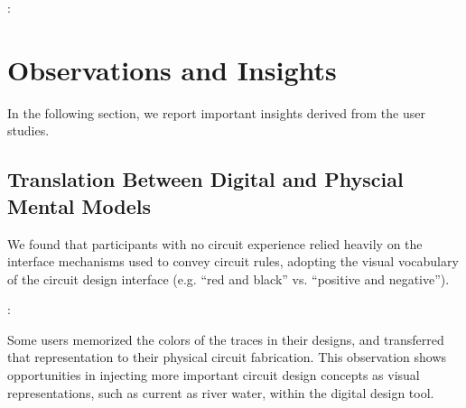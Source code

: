 \documentclass{sigchi}
\begin{document}
  \begin{myquote}
   \vspace{-2pt}
    :
    \vspace{-2pt}
  \end{myquote}

\section{Observations and Insights}
In the following section, we report important insights derived from the user studies.

  \subsection{Translation Between Digital and Physcial Mental Models}
  We found that participants with no circuit experience relied heavily on the interface mechanisms used to convey circuit rules, adopting the visual vocabulary of the circuit design interface (e.g. ``red and black'' vs. ``positive and negative'').
  \begin{myquote}
   \vspace{-2pt}
    :
    \vspace{-2pt}
  \end{myquote}
 Some users memorized the colors of the traces in their designs, and transferred that representation to their physical circuit fabrication. This observation shows opportunities in injecting more important circuit design concepts as visual representations, such as current as river water, within the digital design tool.
  
\end{document}
